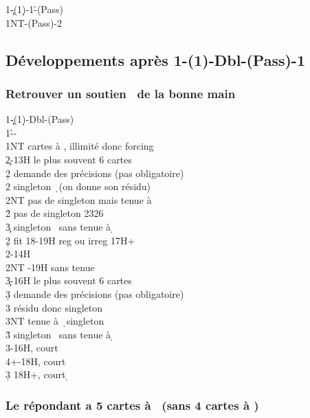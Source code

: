 \documentclass[a4paper]{article}
\begin{document}
\begin{bidtable}
1\c-(1\d)-1\h-(Pass)\\
1NT-(Pass)-2\s
\end{bidtable}

\subsection{Développements après 1\pdfc-(1\pdfd)-Dbl-(Pass)-1\pdfh}

\subsubsection{Retrouver un soutien \pdfs\ de la bonne main}

\begin{bidtable}
1\c-(1\d)-Dbl-(Pass)\\
1\h--\\
1NT  cartes à \s , illimité donc forcing\+\\
2\c {}-13H le plus souvent 6 cartes\+\\
2\d \> demande des précisions (pas obligatoire)\+\\
2\s \> singleton \d\ (on donne son résidu)\\
2NT \> pas de singleton mais tenue à \d \\
2\h \> pas de singleton 2326\\
3\c \> singleton \s\ sans tenue à \d \-\-\\
2\d \> fit 18-19H reg ou irreg 17H+\\
2\s {}-14H\\
2NT -19H sans tenue\\
3\c {}-16H le plus souvent 6 cartes\+\\
3\d \> demande des précisions (pas obligatoire)\+\\
3\s \> résidu donc singleton \d \\
3NT \> tenue à \d\ singleton \s \\
3\h \> singleton \s\ sans tenue à \d \-\-\\
3\s {}-16H, court \d \\
4\s {}+-18H, court \d \\
3\d \> 18H+, court \d \-
\end{bidtable}

\subsubsection{Le répondant a 5 cartes à \pdfh\ (sans 4 cartes à \pdfs)}
\end{document}
